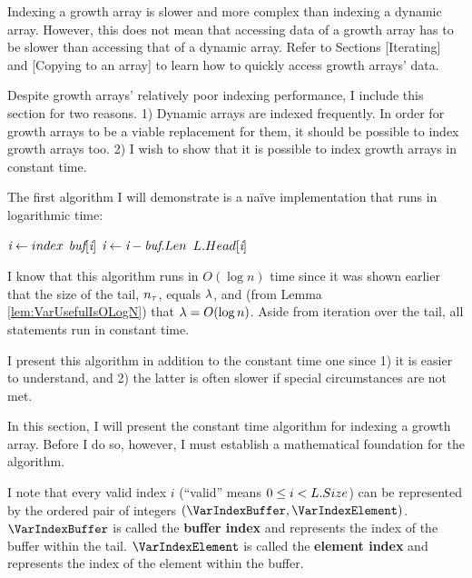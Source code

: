 \HdrGrowthArrayImpl

Indexing a growth array is slower and more complex than indexing a dynamic array. However, this does not mean that accessing data of a growth array has to be slower than accessing that of a dynamic array. Refer to Sections [Iterating] and [Copying to an array] to learn how to quickly access growth arrays' data.

Despite growth arrays' relatively poor indexing performance, I include this section for two reasons. 1) Dynamic arrays are indexed frequently. In order for growth arrays to be a viable replacement for them, it should be possible to index growth arrays too. 2) I wish to show that it is possible to index growth arrays in constant time.

\HdrLogarithmicImpl

The first algorithm I will demonstrate is a na\"{i}ve implementation that runs in logarithmic time:

\begin{algorithm}
	\begin{algorithmic}
			\State $\textit{i} \gets index$
					\State \Return $\textit{buf}[\textit{i}]$
				\EndIf
				\State $\textit{i} \gets \textit{i} - \textit{buf}.Len$
			\EndFor
			\State \Return $L.Head[\textit{i}]$
		\EndFunction
	\end{algorithmic}
\end{algorithm}

I know that this algorithm runs in $O(\log n)$ time since it was shown earlier that the size of the tail, $n_\tau$, equals $\lambda$, and (from Lemma \ref{lem:VarUsefulIsOLogN}) that $\lambda = O(\log n)$. Aside from iteration over the tail, all statements run in constant time.

I present this algorithm in addition to the constant time one since 1) it is easier to understand, and 2) the latter is often slower if special circumstances are not met.

\HdrConstantImpl


In this section, I will present the constant time algorithm for indexing a growth array. Before I do so, however, I must establish a mathematical foundation for the algorithm.

I note that every valid index $i$ (``valid'' means $0 \leq i < L.Size$) can be represented by the ordered pair of integers $(\VarIndexBuffer, \VarIndexElement)$. $\VarIndexBuffer$ is called the \textbf{buffer index} and represents the index of the buffer within the tail. $\VarIndexElement$ is called the \textbf{element index} and represents the index of the element within the buffer.

